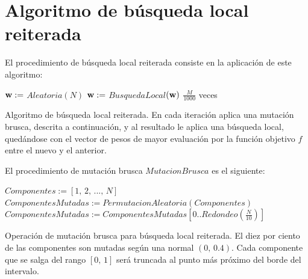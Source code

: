 \documentclass{article}
\newenvironment{algo}{
	\vspace*{0.5cm}
	\begin{algorithm}[H]}{
	\end{algorithm}
	\vspace*{0.5cm}
}
\begin{document}
\section{Algoritmo de búsqueda local reiterada}

El procedimiento de búsqueda local reiterada consiste en la aplicación de este algoritmo:

\begin{algo}
	\BlankLine
	$\normalfont \textbf w :=$ \hyperref[random]{$Aleatoria$}$(N)$\;
	$\normalfont \textbf w :=$ \hyperref[bl]{$BusquedaLocal$}$(\normalfont \textbf w)$\;
	 $\frac M {1000}$ veces\;
	\vspace{0.2cm}
	\caption{Algoritmo de búsqueda local reiterada. En cada iteración aplica una mutación brusca, descrita a continuación, y al resultado le aplica una búsqueda local, quedándose con el vector de pesos de mayor evaluación por la función objetivo $f$ entre el nuevo y el anterior.}
\end{algo}

El procedimiento de mutación brusca $MutacionBrusca$ es el siguiente:

\begin{algo}
	\BlankLine

	$Componentes := [1,\,2,\,...,\,N]$\;
	$ComponentesMutadas := PermutacionAleatoria(Componentes)$\;
	$ComponentesMutadas := ComponentesMutadas[0..Redondeo(\frac N {10})]$

	\vspace{0.2cm}
	\caption{Operación de mutación brusca para búsqueda local reiterada. El diez por ciento de las componentes son mutadas según una normal $(0,\, 0.4)$. Cada componente que se salga del rango $[0,\, 1]$ será truncada al punto más próximo del borde del intervalo.}
\end{algo}
\end{document}
